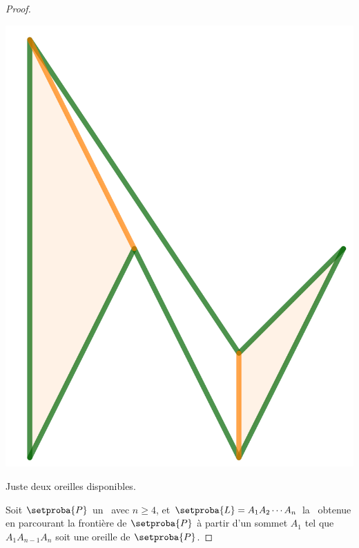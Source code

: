 \begin{proof}
\begin{multicols}{2}
    	\begin{center}
        	\includegraphics[scale=.4]{content/polygon/sufficient-cond/mini-ear-2.png}
        
        	\smallskip
       		Juste deux oreilles disponibles.
    	\end{center}
    \end{multicols}
    
    
    
    Soit $\setproba{P}$ un \ngone\ avec $n \geq 4$, et $\setproba{L} = A_1 A_2 \cdots A_n$ la \nline\ obtenue en parcourant la frontière de $\setproba{P}$ à partir d'un sommet $A_1$ tel que $A_1 A_{n-1} A_n$ soit une oreille de $\setproba{P}$.
    

\end{proof}
